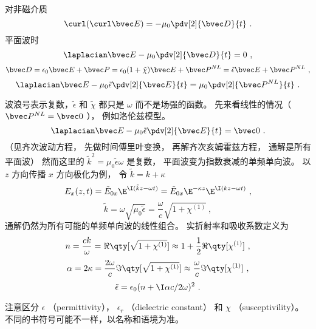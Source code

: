 
\begin{issues}
\issueDraft
\end{issues}


对非磁介质
\begin{equation}
\curl (\curl \bvec E) = -\mu_0 \pdv[2]{\bvec D}{t}~.
\end{equation}
平面波时
\begin{equation}
\laplacian \bvec E - \mu_0 \pdv[2]{\bvec D}{t} = 0~,
\end{equation}
\begin{equation}
\bvec D = \epsilon_0 \bvec E + \bvec P = \epsilon_0(1 + \tilde\chi)\bvec E + \bvec P^{NL} = \tilde \epsilon \bvec E + \bvec P^{NL}~,
\end{equation}
\begin{equation}
\laplacian\bvec E - \mu_0\tilde\epsilon \pdv[2]{\bvec E}{t} = \mu_0 \pdv[2]{\bvec P^{NL}}{t}~.
\end{equation}
 
波浪号表示复数，$\tilde\epsilon$ 和 $\tilde\chi$ 都只是 $\omega$ 而不是场强的函数。 先来看线性的情况（ $\bvec P^{NL} = \bvec 0$ ）， 例如洛伦兹模型。
\begin{equation}
\laplacian\bvec E - \mu_0 \tilde\epsilon \pdv[2]{\bvec E}{t} = \bvec 0~.
\end{equation}
（见齐次波动方程， 先做时间傅里叶变换， 再解齐次亥姆霍兹方程， 通解是所有平面波） 然而这里的 $\tilde k^2 = \mu_0 \tilde \epsilon \omega$ 是复数， 平面波变为指数衰减的单频单向波。 以 $z$ 方向传播 $x$ 方向极化为例， 令  $\tilde k = k + \kappa$
\begin{equation}
E_x(z,t) = \tilde E_{0x} \E^{\I(\tilde kz - \omega t)} = \tilde E_{0x} \E^{-\kappa z} \E^{\I(kz - \omega t)}~,
\end{equation}
\begin{equation}
\tilde k = \omega \sqrt{\mu_0\tilde\epsilon} = \frac{\omega }{c}\sqrt {1 + \chi ^{(1)}}~,
\end{equation}
通解仍然为所有可能的单频单向波的线性组合。 实折射率和吸收系数定义为
\begin{equation}
n = \frac{ck}{\omega } = \Re\qty[\sqrt{1 + \chi ^{(1)}}] \approx 1 + \frac12 \Re\qty[\chi^{(1)}]~,
\end{equation}
\begin{equation}
\alpha  = 2\kappa  = \frac{2\omega}{c} \Im\qty[\sqrt{1+\chi^{(1)}}] \approx \frac{\omega}{c}\Im\qty[\chi ^{(1)}]~,
\end{equation}
\begin{equation}
\tilde \epsilon  = \epsilon_0 (n + \I \alpha c/2\omega )^2~.
\end{equation}
 
注意区分 $\epsilon$ （permittivity）， $\epsilon_r$ （dielectric constant） 和 $\chi$ （susceptivility）。 不同的书符号可能不一样，以名称和语境为准。
